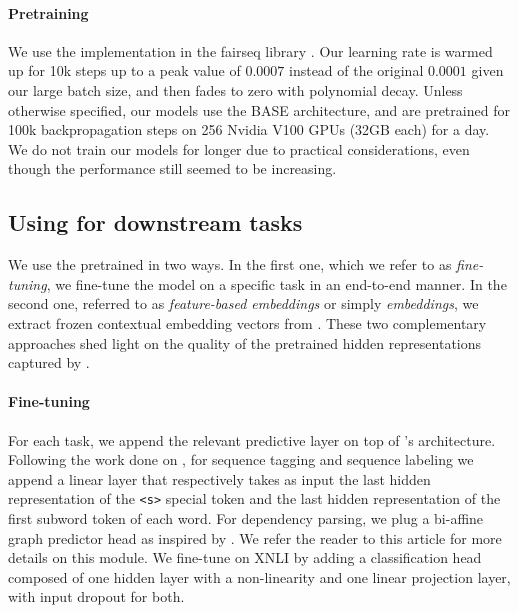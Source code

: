 \paragraph{Pretraining}
We use the \roberta implementation in the fairseq library \cite{ott2019fairseq}.
Our learning rate is warmed up for 10k steps up to a peak value of $0.0007$ instead of the original $0.0001$ given our large batch size, and then fades to zero with polynomial decay.
Unless otherwise specified, our models use the BASE architecture, and are pretrained for 100k backpropagation steps on 256 Nvidia V100 GPUs (32GB each) for a day.
We do not train our models for longer due to practical considerations, even though the performance still seemed to be increasing.

\subsection{Using \camembert for downstream tasks}
We use the pretrained \camembert in two ways. In the first one, which we refer to as \textit{fine-tuning}, we fine-tune the model on a specific task in an end-to-end manner. In the second one, referred to as \textit{feature-based embeddings} or simply \textit{embeddings}, we extract frozen contextual embedding vectors from \camembert.
These two complementary approaches shed light on the quality of the pretrained hidden representations captured by \camembert.


\paragraph{Fine-tuning}
For each task, we append the relevant predictive layer on top of \camembert's  architecture. Following the work done on \bert \cite{devlin-etal-2019-bert}, for sequence tagging and sequence labeling we append a linear layer that respectively takes as input the last hidden representation of the \texttt{<s>} special token and the last hidden representation of the first subword token of each word.
For dependency parsing, we plug a bi-affine graph predictor head as inspired by \citet{dozat2017deep}. We refer the reader to this article for more details on this module.
We fine-tune on XNLI by adding a classification head composed of one hidden layer with a non-linearity and one linear projection layer, with input dropout for both.

